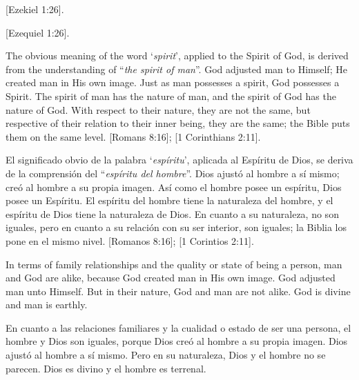 [Ezekiel 1:26].


[Ezequiel 1:26].


The obvious meaning of the word ‘\textit{spirit}’, applied to the Spirit of God, is derived from the understanding of “\textit{the spirit of man}”. God adjusted man to Himself; He created man in His own image. Just as man possesses a spirit, God possesses a Spirit. The spirit of man has the nature of man, and the spirit of God has the nature of God. With respect to their nature, they are not the same, but respective of their relation to their inner being, they are the same; the Bible puts them on the same level. [Romans 8:16]; [1 Corinthians 2:11].


El significado obvio de la palabra ‘\textit{espíritu}’, aplicada al Espíritu de Dios, se deriva de la comprensión del “\textit{espíritu del hombre}”. Dios ajustó al hombre a sí mismo; creó al hombre a su propia imagen. Así como el hombre posee un espíritu, Dios posee un Espíritu. El espíritu del hombre tiene la naturaleza del hombre, y el espíritu de Dios tiene la naturaleza de Dios. En cuanto a su naturaleza, no son iguales, pero en cuanto a su relación con su ser interior, son iguales; la Biblia los pone en el mismo nivel. [Romanos 8:16]; [1 Corintios 2:11].


In terms of family relationships and the quality or state of being a person, man and God are alike, because God created man in His own image. God adjusted man unto Himself. But in their nature, God and man are not alike. God is divine and man is earthly.


En cuanto a las relaciones familiares y la cualidad o estado de ser una persona, el hombre y Dios son iguales, porque Dios creó al hombre a su propia imagen. Dios ajustó al hombre a sí mismo. Pero en su naturaleza, Dios y el hombre no se parecen. Dios es divino y el hombre es terrenal.


